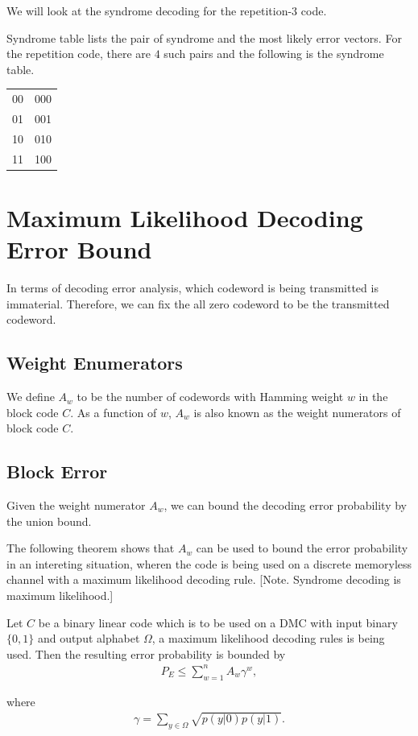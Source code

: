 \begin{example}
We will look at the syndrome decoding for the repetition-\(3\) code.

Syndrome table lists the pair of syndrome and the most likely error vectors. For the repetition code, there are \(4\) such pairs and the following is the syndrome table. 

\begin{center}
\begin{tabular}{ c c  }
00 & 000 \\ 
01 & 001 \\
10 & 010 \\
11 & 100 \\
\end{tabular}
\end{center}

\end{example}

\section{Maximum Likelihood Decoding Error Bound}
In terms of decoding error analysis, which codeword is being transmitted is immaterial. Therefore, we can fix the all zero codeword to be the transmitted codeword.

\subsection{Weight Enumerators}
We define \(A_w\) to be the number of codewords with Hamming weight \(w\) in the block code \(C\). As a function of \(w\), \(A_w\) is also known as the weight numerators of block code \(C\).

\subsection{Block Error}
Given the weight numerator \(A_w\),  we can bound the decoding error probability by the union bound. 

The following theorem shows that \(A_w\) can be used to bound the error probability in an intereting situation, wheren the code is being used on a discrete memoryless channel with a maximum likelihood decoding rule. [Note. Syndrome decoding is maximum likelihood.] 

\begin{theorem}
    Let \(C\) be a binary linear code which is to be used on a DMC with input binary \(\{0, 1\}\) and output alphabet \(\Omega\), a maximum likelihood decoding rules is being used. Then the resulting error probability is bounded by 
    \begin{align*}
        P_E \leq \sum_{w=1}^{n} A_w \gamma ^w, 
    \end{align*}

    where 
    \begin{align}
        \gamma = \sum_{y\in \Omega} \sqrt{p(y|0)p(y|1)}.
    \end{align}
\end{theorem}

